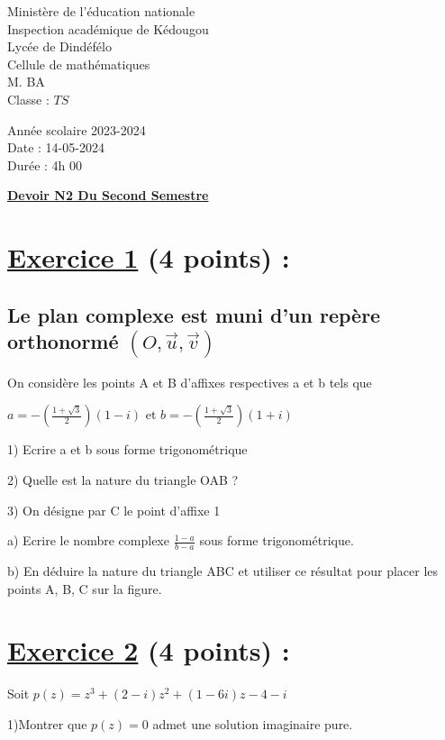 \documentclass{article}
\begin{document}
\begin{minipage}{0.5\textwidth}
	Ministère de l'éducation nationale  \\
	Inspection académique de Kédougou   \\
	Lycée de Dindéfélo            \\
	Cellule de mathématiques            \\
	M. BA                          \\
	Classe : $TS$  \\
\end{minipage}
\begin{minipage}{0.5\textwidth}
	Année scolaire 2023-2024 \\
	Date : 14-05-2024 \\
	Durée : 4h 00 \\
\end{minipage}

\begin{center}
	\textbf{{\underline{Devoir N2 Du Second Semestre}}}
\end{center}

\section*{\underline{Exercice 1} (4 points) :}
\subsection*{Le plan complexe est muni d’un repère orthonormé $(O,\vec{u},\vec{v})$}
On considère les points A et B d’affixes respectives a et b tels que

$a=-(\frac{1+\sqrt{3}}{2})(1-i)$ et $b=-(\frac{1+\sqrt{3}}{2})(1+i)$ 

1) Ecrire a et b sous forme trigonométrique

2) Quelle est la nature du triangle OAB ?

3) On désigne par C le point d’affixe 1

a) Ecrire le nombre complexe $\frac{1-a}{b-a}$  sous forme trigonométrique.

b) En déduire la nature du triangle ABC et  utiliser ce résultat pour placer les points A, B, C sur la figure.
\section*{\underline{Exercice 2} (4 points) :}
Soit $p(z)=z^{3}+(2-i)z^{2}+(1-6i)z-4-i$

1)Montrer que $p(z)=0$ admet une solution imaginaire pure.
\end{document}
